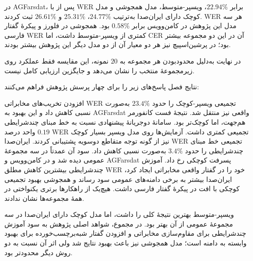 در AGFarsdat، پس از  با WER برابر $22.94\%$، ویسپر-متوسط، مدل همجوشی و مدل کوچک دارای ایران‌صدا به‌ترتیب $24.77\%$، $25.31\%$ و $26.61\%$ ثبت کردند. WER هر سه مدل این پژوهش در کامن‌وویس برابر $0.58\%$ بود. همجوشی در فلورز و پیکرهٔ گفتار فارسی WER کمتری از ویسپر-متوسط داشت، اما CER آن در این دو مجموعه بیشتر بود؛ در پرشین‌اسپیچ نیز هر دو معیار آن از دو مدل دیگر این پژوهش بیشتر بودند.

در نهایت به‌دلیل محدودبودن هر مجموعه به $20$ نمونه، این مقایسه فقط عملکرد روی زیرمجموعهٔ منتخب را نشان می‌دهد و جایگزین ارزیابی کامل نیست.


نتایج فصل پاسخ‌های زیر را برای چهار پرسش پژوهش فراهم می‌کنند:

  افزودن تخریب‌های مخابراتی WER تجمیعی ویسپر-کوچک را حدود $23.4\%$ به‌صورت نسبی کاهش داد و این بهبود به AGFarsdat واقعی نیز منتقل شد. نتیجهٔ فست کانفورمر هم‌جهت، اما کوچک‌تر بود.
  سامانهٔ دوجریانهٔ پیشنهادی نسبت به خط مبنای چندشرایطی $0.19$ واحد درصد WER تجمیعی کمتری داشت. آزمایش‌ها روی مدل ویسپر بسیار کوچک نیز از گونه توجه متقاطع دوسویه پشتیبانی کردند.
  ایران‌صدا WER تجمیعی خط مبنای چندشرایطی را حدود $3.4\%$ به‌صورت نسبی کاهش داد. سود آن عمدتاً در سه مجموعهٔ عمومی دیده شد و در کامن‌وویس و AGFarsdat پسرفت کوچکی رخ داد.
  آموزش چندشرایطی بیشترین کاهش مطلق WER خود را در گفتار واقعی مخابراتی ایجاد کرد، ایران‌صدا بیشتر به برخی دامنه‌های عمومی سود رساند و همجوشی بهبود تجمیعی کوچکی با افت در پیکرهٔ گفتار فارسی داشت. هیچ‌یک از راهکارها برتری یکنواختی در همهٔ مجموعه‌ها نشان ندادند.

ویسپر-متوسط بهترین نتیجهٔ کلی را داشت، اما مدل کوچک دارای ایران‌صدا در سه مجموعهٔ عمومی از آن بهتر بود. در مجموع، شواهد اصلی پژوهش به سود آموزش چندشرایطی برای مقاوم‌سازی مخابراتی و افزودن گفتار شبه‌برچسب‌خورده برای بهبود وابسته به دامنه است؛ مدل همجوشی نیز باعث بهبود نتایج شد ولی اثر آن نسبت به دو روش دیگر محدودتر بود.

